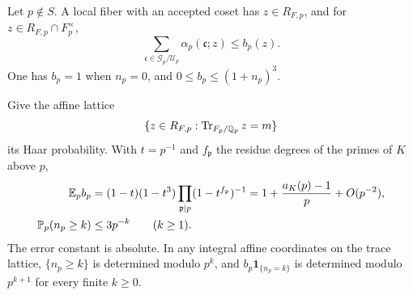 \begin{lemma}
\label{lem:ext-unramified-data}
Let \(p\notin S\).  A local fiber with an accepted coset has
\(z\in R_{F,p}\), and for \(z\in R_{F,p}\cap F_p^\times\),
\begin{equation}
 \sum_{\mathfrak c\in\mathscr G_p/\mathscr U_p}
       \alpha_p(\mathfrak c;z)\le b_p(z).
 \label{eq:ext-unramified-cosets}
\end{equation}
One has \(b_p=1\) when \(n_p=0\), and \(0\le b_p\le(1+n_p)^3\).

Give the affine lattice
\[
 \{z\in R_{F,p}:\operatorname{Tr}_{F_p/\mathbb Q_p}z=m\}
\]
its Haar probability.  With \(t=p^{-1}\) and
\(f_{\mathfrak p}\) the residue degrees of the primes of \(K\) above \(p\),
\begin{align}
 \mathbb E_p b_p
   &=(1-t)(1-t^3)
       \prod_{\mathfrak p\mid p}(1-t^{f_{\mathfrak p}})^{-1}
     =1+\frac{a_K(p)-1}{p}+O(p^{-2}), \label{eq:ext-unramified-mean}\\
 \mathbb P_p(n_p\ge k)&\le3p^{-k}\qquad(k\ge1). \label{eq:ext-unramified-tail}
\end{align}
The error constant is absolute.  In any integral affine coordinates
on the trace lattice, \(\{n_p\ge k\}\) is determined modulo \(p^k\),
and \(b_p\mathbf1_{\{n_p=k\}}\) is determined modulo \(p^{k+1}\)
for every finite \(k\ge0\).
\end{lemma}

